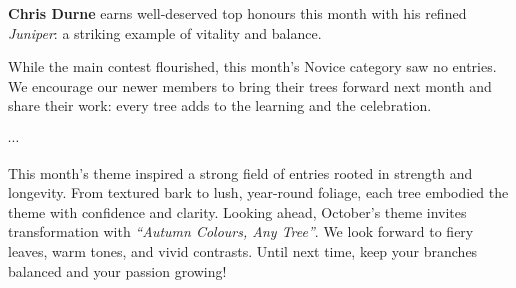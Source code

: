 \noindent
\textbf{Chris Durne} earns well\--deserved top honours this month with his refined \textit{Juniper}: a striking example of vitality and balance.

\noindent
While the main contest flourished, this month's Novice category saw no entries. 
We encourage our newer members to bring their trees forward next month and share their work: every tree adds to the learning and the celebration.

\vspace{-0.25em}
\begin{center}
$\cdots$
\end{center}
\vspace{-0.25em}

\noindent
This month's theme inspired a strong field of entries rooted in strength and longevity. 
From textured bark to lush, year\--round foliage, each tree embodied the theme with confidence and clarity.
Looking ahead, October's theme invites transformation with \textit{``Autumn Colours, Any Tree''}.
We look forward to fiery leaves, warm tones, and vivid contrasts. 
Until next time, keep your branches balanced and your passion growing!
\closearticle
\columnbreak

